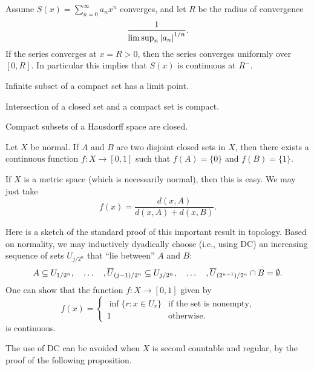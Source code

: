 \begin{namedthm}
    Assume $S(x) = \sum_{n=0}^\infty a_n x^n$ converges, and let $R$ be the radius of convergence \[ \frac{1}{\limsup_n {\lvert a_n \rvert}^{1/n}}.\] If the series converges at $x = R > 0$, then the series converges uniformly over $[0,R]$. In particular this implies that $S(x)$ is continuous at $R^-$.
\end{namedthm}

\begin{prop}
    Infinite subset of a compact set has a limit point.
\end{prop}

\begin{prop}\label{prop:closed-compact-intersect}
    Intersection of a closed set and a compact set is compact.
\end{prop}

\begin{prop}\label{prop:compact-subset-Hausdorff}
    Compact subsets of a Hausdorff space are closed.
\end{prop}

\begin{namedthm}
    Let $X$ be normal. If $A$ and $B$ are two disjoint closed sets in $X$, then there exists a continuous function $f\colon X \to [0,1]$ such that $f(A)=\{0\}$ and $f(B) = \{1\}$.
\end{namedthm}

If $X$ is a metric space (which is necessarily normal), then this is easy. We may just take \[f(x) = \frac{d(x,A)}{d(x,A) + d(x,B)}.\]

Here is a sketch of the standard proof of this important result in topology. Based on normality, we may inductively dyadically choose (i.e., using \textsf{DC}) an increasing sequence of sets $U_{j/2^n}$ that ``lie between'' $A$ and $B$: \[
    A \subseteq U_{1/2^n},\quad \dotsc\quad ,\overline{U}_{(j-1)/2^n} \subseteq U_{j/2^n},\quad \dotsc\quad , \overline{U}_{(2^{n-1})/2^n} \cap B =\emptyset.
\]
One can show that the function $f\colon X\to [0,1]$ given by \[
    f(x) = \begin{cases}
        \inf\{r : x\in U_r\} & \text{if the set is nonempty}, \\
        1 & \text{otherwise}.
    \end{cases}
\] is continuous.

The use of \textsf{DC} can be avoided when $X$ is second countable and regular, by the proof of the following proposition.

